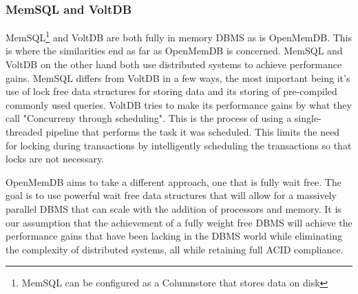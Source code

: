 \documentclass[letterpaper]{article}
\begin{document}
	\subsubsection{MemSQL and VoltDB}
	MemSQL\footnote{MemSQL can be configured as a Columnstore that stores data on disk}
	and VoltDB are both fully in memory DBMS as is OpenMemDB. This is where the
	similarities end as far as OpenMemDB is concerned. MemSQL and VoltDB on the other 
	hand both use distributed systems to achieve performance gains. MemSQL differs from 
	VoltDB in a few ways, the most important being it's use of lock free data structures
	for storing data and its storing of pre-compiled commonly used queries\cite{MemSQL}.
	VoltDB tries to make its performance gains by what they call "Concurreny through
	scheduling"\cite{VoltDB}. This is the process of using a single-threaded pipeline 
	that performs the task it was scheduled. This limits the need for locking during
	transactions by intelligently scheduling the transactions so that locks are not
	necessary.
	\par\vspace{\baselineskip}
	OpenMemDB aims to take a different approach, one that is fully wait free. The goal is 
	to use powerful wait free data structures that will allow for a massively parallel 
	DBMS that can scale with the addition of processors and memory. It is our assumption 
	that the achievement of a fully weight free DBMS will achieve the performance gains 
	that have been lacking in the DBMS world while eliminating the complexity of 
	distributed systems, all while retaining full ACID compliance.
	
\end{document}
